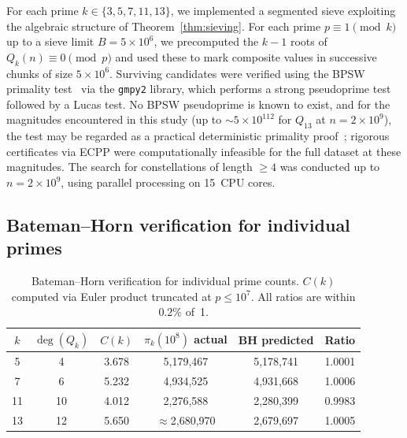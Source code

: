 \documentclass[11pt,a4paper]{article}
\newcommand{\Qk}{Q_k}
\begin{document}
For each prime $k \in \{3, 5, 7, 11, 13\}$, we implemented a segmented sieve exploiting the algebraic structure of Theorem~\ref{thm:sieving}. For each prime $p \equiv 1 \pmod{k}$ up to a sieve limit $B = 5 \times 10^6$, we precomputed the $k-1$ roots of $\Qk(n) \equiv 0 \pmod{p}$ and used these to mark composite values in successive chunks of size $5 \times 10^6$. Surviving candidates were verified using the BPSW primality test~\cite{bpsw} via the \texttt{gmpy2} library, which performs a strong pseudoprime test followed by a Lucas test. No BPSW pseudoprime is known to exist, and for the magnitudes encountered in this study (up to ${\sim}5 \times 10^{112}$ for $Q_{13}$ at $n = 2 \times 10^9$), the test may be regarded as a practical deterministic primality proof~\cite{bpsw}; rigorous certificates via ECPP were computationally infeasible for the full dataset at these magnitudes. The search for constellations of length $\ge 4$ was conducted up to $n = 2 \times 10^9$, using parallel processing on 15~CPU cores.

\subsection{Bateman--Horn verification for individual primes}

\begin{table}[ht]
\centering
\caption{Bateman--Horn verification for individual prime counts. $C(k)$ computed via Euler product truncated at $p \le 10^7$. All ratios are within $0.2\%$ of~1.}\label{tab:BH}
\smallskip
\begin{tabular}{cccccc}
\toprule
$k$ & $\deg(\Qk)$ & $C(k)$ & $\pi_k(10^8)$ actual & BH predicted & Ratio \\
\midrule
5  & 4  & 3.678 & 5{,}179{,}467   & 5{,}178{,}741   & 1.0001 \\
7  & 6  & 5.232 & 4{,}934{,}525   & 4{,}931{,}668   & 1.0006 \\
11 & 10 & 4.012 & 2{,}276{,}588   & 2{,}280{,}399   & 0.9983 \\
13 & 12 & 5.650 & $\approx$2{,}680{,}970 & 2{,}679{,}697 & 1.0005 \\
\bottomrule
\end{tabular}
\end{table}
\end{document}
